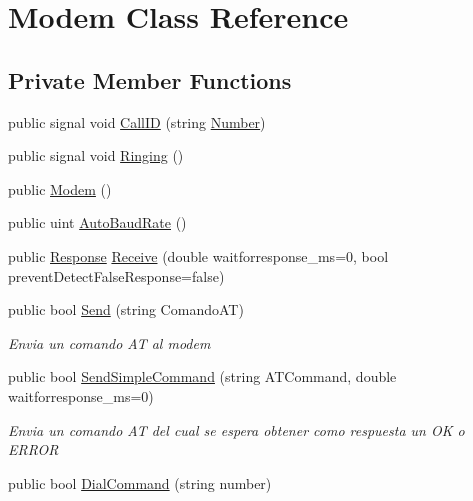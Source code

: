 \hypertarget{classedwinspire_1_1_ports_1_1_modem}{\section{Modem Class Reference}
\label{classedwinspire_1_1_ports_1_1_modem}
}
\subsection*{Private Member Functions}
\begin{DoxyCompactItemize}
\item 
public signal void \hyperlink{classedwinspire_1_1_ports_1_1_modem_a3a7adf7062dcf2a1dc1ab31a3a1b4363}{Call\-I\-D} (string \hyperlink{namespaceedwinspire_1_1_ports_a22f616818dc85fd8ee4b9f3821546acb}{Number})
\item 
public signal void \hyperlink{classedwinspire_1_1_ports_1_1_modem_a890519934c9a30a386c9d6bba65bad19}{Ringing} ()
\item 
public \hyperlink{classedwinspire_1_1_ports_1_1_modem_a2c7bab6abe626951e15295f00be7591f}{Modem} ()
\item 
public uint \hyperlink{classedwinspire_1_1_ports_1_1_modem_a48c9c7f70a693ab16500c4c0ed3ae479}{Auto\-Baud\-Rate} ()
\item 
public \hyperlink{namespaceedwinspire_1_1_ports_afc37e1ee0b1084b5c5fccf2fab440b4f}{Response} \hyperlink{classedwinspire_1_1_ports_1_1_modem_af029f00adf01cac411d73901909df0e9}{Receive} (double waitforresponse\-\_\-ms=0, bool prevent\-Detect\-False\-Response=false)
\item 
public bool \hyperlink{classedwinspire_1_1_ports_1_1_modem_a21ad2b0b92a7de2cd8ea614f0ea4f8fd}{Send} (string Comando\-A\-T)
\begin{DoxyCompactList}\small\item\em Envia un comando A\-T al modem \end{DoxyCompactList}\item 
public bool \hyperlink{classedwinspire_1_1_ports_1_1_modem_a8556df8675e2894fa7afdb9dae873233}{Send\-Simple\-Command} (string A\-T\-Command, double waitforresponse\-\_\-ms=0)
\begin{DoxyCompactList}\small\item\em Envia un comando A\-T del cual se espera obtener como respuesta un O\-K o E\-R\-R\-O\-R \end{DoxyCompactList}\item 
public bool \hyperlink{classedwinspire_1_1_ports_1_1_modem_a9fd3380484b204fe63c848b282a511ee}{Dial\-Command} (string number)

\end{DoxyCompactItemize}
